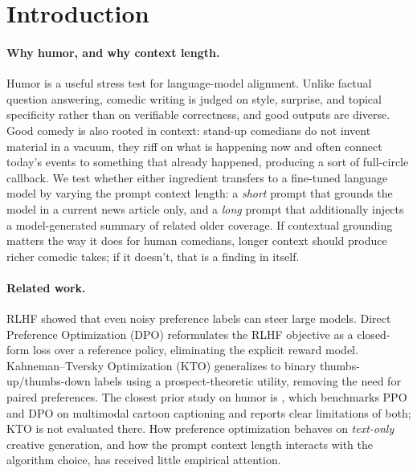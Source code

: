 \section{Introduction}
\label{sec:intro}

\paragraph{Why humor, and why context length.}
Humor is a useful stress test for language-model alignment.  Unlike factual question answering, comedic writing is judged on style, surprise, and topical specificity rather than on verifiable correctness, and good outputs are diverse.  Good comedy is also rooted in context: stand-up comedians do not invent material in a vacuum, they riff on what is happening now and often connect today's events to something that already happened, producing a sort of full-circle callback.  We test whether either ingredient transfers to a fine-tuned language model by varying the prompt context length: a \emph{short} prompt that grounds the model in a current news article only, and a \emph{long} prompt that additionally injects a model-generated summary of related older coverage.  If contextual grounding matters the way it does for human comedians, longer context should produce richer comedic takes; if it doesn't, that is a finding in itself.

\paragraph{Related work.}
RLHF \cite{ouyang2022training,stiennon2020learning} showed that even noisy preference labels can steer large models.  Direct Preference Optimization (DPO) \cite{rafailov2023direct} reformulates the RLHF objective as a closed-form loss over a reference policy, eliminating the explicit reward model.  Kahneman--Tversky Optimization (KTO) \cite{ethayarajh2024kto} generalizes to binary thumbs-up/thumbs-down labels using a prospect-theoretic utility, removing the need for paired preferences.  The closest prior study on humor is \cite{zhang2024humor}, which benchmarks PPO and DPO on multimodal cartoon captioning and reports clear limitations of both; KTO is not evaluated there.  How preference optimization behaves on \emph{text-only} creative generation, and how the prompt context length interacts with the algorithm choice, has received little empirical attention.

